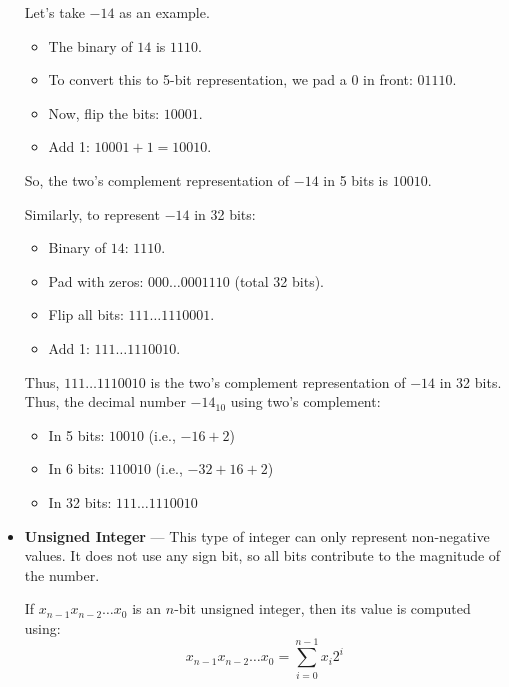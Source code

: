 \documentclass[12pt]{book}
\begin{document}
\begin{itemize}
\begin{example}
        Let's take $-14$ as an example.

        \begin{itemize}
            \item The binary of $14$ is $1110$.
            \item To convert this to 5-bit representation, we pad a 0 in front: $01110$.
            \item Now, flip the bits: $10001$.
            \item Add 1: $10001 + 1 = 10010$.
        \end{itemize}

        So, the two's complement representation of $-14$ in 5 bits is $10010$.

        \medskip
        Similarly, to represent $-14$ in 32 bits:
        \begin{itemize}
            \item Binary of $14$: $1110$.
            \item Pad with zeros: $000\ldots0001110$ (total 32 bits).
            \item Flip all bits: $111\ldots1110001$.
            \item Add 1: $111\ldots1110010$.
        \end{itemize}

        Thus, $111\ldots1110010$ is the two's complement representation of $-14$ in 32 bits.
        Thus, the decimal number $-14_{10}$ using two's complement:
        \begin{itemize}
            \item In 5 bits: $10010$ (i.e., $-16 + 2$)
            \item In 6 bits: $110010$ (i.e., $-32 + 16 + 2$)
            \item In 32 bits: $111\ldots1110010$
        \end{itemize}
    \end{example}

    \item \textbf{Unsigned Integer} — This type of integer can only represent non-negative values. It does not use any sign bit, so all bits contribute to the magnitude of the number.

    If $x_{n-1}x_{n-2}\ldots x_0$ is an $n$-bit unsigned integer, then its value is computed using:
    \begin{equation} \label{eq:unsigned}
        x_{n-1}x_{n-2}\ldots x_0 = \sum_{i=0}^{n-1} x_i 2^i
    \end{equation}


\end{itemize}
\end{document}
